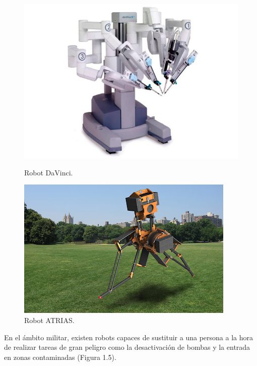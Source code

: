 \documentclass[a4paper, 12pt]{book}
\begin{document}
\begin{figure}[H]
  \centering
  \begin{minipage}[b]{0.4\textwidth}
    \includegraphics[width=\textwidth]{img/davinci}
    \caption{Robot DaVinci.}
    \label{figura:robot_davinci}
  \end{minipage}
  \hfill
  \begin{minipage}[b]{0.4\textwidth}
    \includegraphics[width=\textwidth]{img/atrias}
    \caption{Robot ATRIAS.}
    \label{figura:robot_atrias}
  \end{minipage}
\end{figure}

En el ámbito militar, existen robots capaces de sustituir a una persona a la hora de realizar tareas de gran peligro como la desactivación de bombas y la entrada en zonas contaminadas (Figura 1.5).
\end{document}
